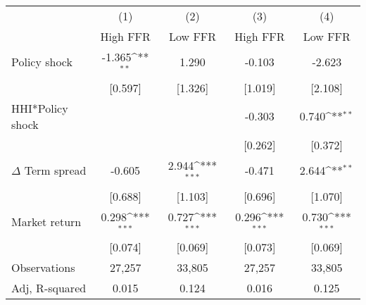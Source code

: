{
\def\sym#1{\ifmmode^{#1}\else\(^{#1}\)\fi}
\begin{tabular*}{\hsize}{@{\hskip\tabcolsep\extracolsep\fill}l*{4}{c}}
\hline\hline
                    &\multicolumn{1}{c}{(1)}&\multicolumn{1}{c}{(2)}&\multicolumn{1}{c}{(3)}&\multicolumn{1}{c}{(4)}\\
                    &\multicolumn{1}{c}{High FFR}&\multicolumn{1}{c}{Low FFR}&\multicolumn{1}{c}{High FFR}&\multicolumn{1}{c}{Low FFR}\\
\hline
Policy shock        &      -1.365\sym{**} &       1.290         &      -0.103         &      -2.623         \\
                    &     [0.597]         &     [1.326]         &     [1.019]         &     [2.108]         \\
[1em]
HHI*Policy shock    &                     &                     &      -0.303         &       0.740\sym{**} \\
                    &                     &                     &     [0.262]         &     [0.372]         \\
[1em]
$\Delta$ Term spread&      -0.605         &       2.944\sym{***}&      -0.471         &       2.644\sym{**} \\
                    &     [0.688]         &     [1.103]         &     [0.696]         &     [1.070]         \\
[1em]
Market return       &       0.298\sym{***}&       0.727\sym{***}&       0.296\sym{***}&       0.730\sym{***}\\
                    &     [0.074]         &     [0.069]         &     [0.073]         &     [0.069]         \\
\hline
Observations        &      27,257         &      33,805         &      27,257         &      33,805         \\
Adj, R-squared      &       0.015         &       0.124         &       0.016         &       0.125         \\
\hline\hline
\end{tabular*}
}
